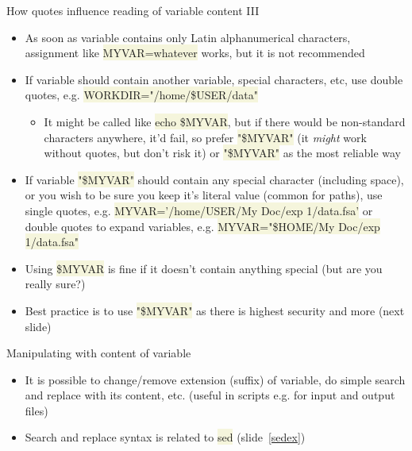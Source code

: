 \documentclass[compress, xelatex, 11pt, xcolor=svgnames, aspectratio=169, url={hyphens, lowtilde}]{beamer}
\renewcommand{\texttt}[1]{\colorbox{Beige}{{\ttfamily #1}}}
\begin{document}
\begin{frame}{How quotes influence reading of variable content III}
	\begin{itemize}
		\item As soon as variable contains only Latin alphanumerical characters, assignment like \texttt{MYVAR=whatever} works, but it is not recommended
		\item If variable should contain another variable, special characters, etc, use double quotes, e.g. \texttt{WORKDIR="/home/\$USER/data"}
		\begin{itemize}
		 \item It might be called like \texttt{echo \$MYVAR}, but if there would be non-standard characters anywhere, it'd fail, so prefer \texttt{"\$MYVAR"} (it \textit{might} work without quotes, but don't risk it) or \texttt{"\$\textbraceleft MYVAR\textbraceright"} as the most reliable way
		\end{itemize}
		\item If variable \texttt{"\$\textbraceleft MYVAR\textbraceright"} should contain any special character (including space), or you wish to be sure you keep it's literal value (common for paths), use single quotes, e.g. \texttt{MYVAR='/home/USER/My Doc/exp 1/data.fsa'} or double quotes to expand variables, e.g. \texttt{MYVAR="\$HOME/My Doc/exp 1/data.fsa"}
		\item Using \texttt{\$MYVAR} is fine if it doesn't contain anything special (but are you really sure?)
		\item Best practice is to use \texttt{"\$\textbraceleft MYVAR\textbraceright"} as there is highest security and more (next slide)
	\end{itemize}
\end{frame}

\begin{frame}[fragile]{Manipulating with content of variable}
	\begin{itemize}
		\item It is possible to change/remove extension (suffix) of variable, do simple search and replace with its content, etc. (useful in scripts e.g. for input and output files)
		\item Search and replace syntax is related to \texttt{sed} (slide~\ref{sedex})
	\end{itemize}
\end{frame}
\end{document}
